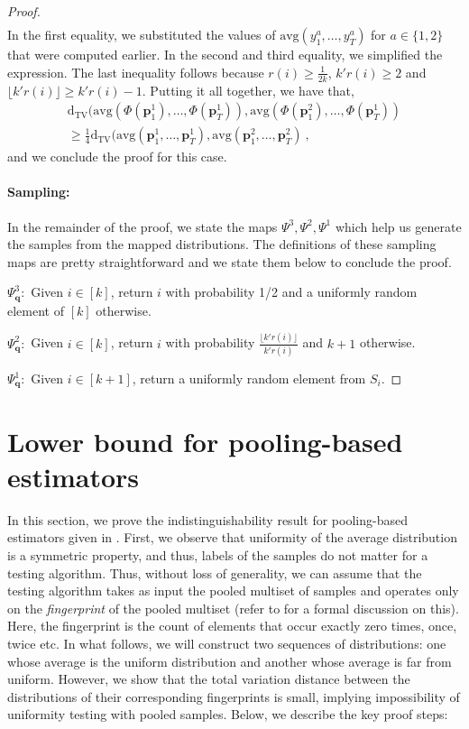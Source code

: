 \documentclass[10pt]{article} %
\theoremstyle{plain}
\newcommand{\bp}{\textbf{p}}
\newcommand{\bq}{\textbf{q}}
\newcommand{\br}{\textbf{r}}
\newcommand{\bs}{\textbf{s}}
\newcommand{\dtv}{\mathrm{d_{TV}}}
\newcommand{\avg}{\mathrm{avg}}
\begin{document}
\begin{proof}
\begin{align*}
	\end{align*}
	In the first equality, we substituted the values of $\avg(y_1^a,\dots,y_T^a)$ for $a\in \{1,2\}$ that were computed earlier. In the second and third equality, we simplified the expression. The last inequality follows because $r(i)\geq \frac{1}{2k}$, $k'r(i) \geq 2$ and $\lfloor k'r(i)\rfloor \geq k'r(i)-1$. Putting it all together, we have that,
	\begin{align*}
		\dtv(\avg(\Phi(\bp^1_1),\dots,\Phi(\bp^1_T)),\avg(\Phi(\bp^2_1),\dots,\Phi(\bp^1_T)) \\
		\geq \frac{1}{4}\dtv(\avg(\bp^1_1,\dots,\bp^1_T),\avg(\bp^2_1,\dots,\bp^2_T)~,
	\end{align*}
	and we conclude the proof for this case.
	
	\paragraph{Sampling:} In the remainder of the proof, we state the maps $\Psi^3,\Psi^2,\Psi^1$ which help us generate the samples from the mapped distributions. The definitions of these sampling maps are pretty straightforward and we state them below to conclude the proof.
	
	$\Psi^3_{\bq}:$ Given $i \in [k]$, return $i$ with probability 1/2 and a uniformly random element of $[k]$ otherwise.
	
	$\Psi^2_{\bq}:$ Given $i \in [k]$, return $i$ with probability $\frac{\lfloor k'r(i)\rfloor}{k'r(i)}$ and $k+1$ otherwise.
	
	$\Psi^1_{\bq}:$ Given $i \in [k+1]$, return a uniformly random element from $S_i$.
\end{proof}
\section{Lower bound for pooling-based estimators}
\label{sec:lb_pool}

\allowdisplaybreaks

\newcommand{\fp}{FP(\bp)}
\newcommand{\fq}{FP(\bq)}
\newcommand{\fr}{FP(\br)}
\newcommand{\fs}{FP(\bs)}

In this section, we prove the indistinguishability result for pooling-based estimators given in . First, we observe that uniformity of the average distribution is a symmetric property, and thus, labels of the samples do not matter for a testing algorithm. %
Thus, without loss of generality, we can assume that the testing algorithm takes as input the pooled multiset of samples and operates only on the \textit{fingerprint}  of the pooled multiset (refer to  for a formal discussion on this). Here, the fingerprint is the count of elements that occur exactly zero times, once, twice etc. In what follows, we will construct two sequences of distributions: one whose average is the uniform distribution and another whose average is far from uniform. However, we show that the total variation distance between the distributions of their corresponding fingerprints is small, implying impossibility of uniformity testing with pooled samples. Below, we describe the key proof steps:
\end{document}
